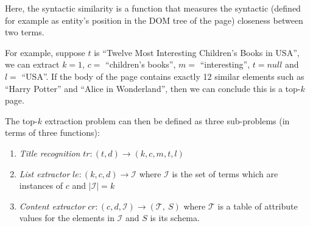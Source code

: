 Here, the syntactic similarity is a function that measures the
syntactic (defined for example as entity's position in the DOM tree
of the page) closeness between two terms.

For example, suppose $t$ is ``Twelve Most Interesting Children’s Books in
USA'', we can extract $k = 1$, $c = $ ``children's books'',
$m = $ ``interesting'', $t = null$ and $l = $ ``USA''. If
the body of the page contains exactly 12 similar elements
such as ``Harry Potter'' and ``Alice in Wonderland'',
then we can conclude this is a top-$k$ page.

%
The top-$k$ extraction problem can then be defined as three sub-problems
(in terms of three functions):
\begin{enumerate}
\item {\em Title recognition} $tr : (t, d) \rightarrow (k, c, m, t, l)$
\item {\em List extractor} $le : (k, c, d) \rightarrow \mathcal{I}$ where
$\mathcal{I}$ is the set of terms which are instances of
$c$ and $|\mathcal{I}| = k$
\item {\em Content extractor} $cr : (c, d, \mathcal{I}) \rightarrow
(\mathcal{T},~ S)$ where $\mathcal{T}$ is a table of attribute values for
the elements in $\mathcal{I}$ and $S$ is its schema.
\end{enumerate}

